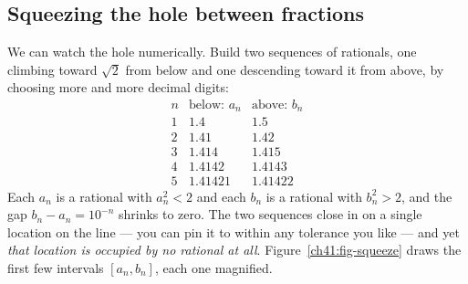 \subsection*{Squeezing the hole between fractions}

We can watch the hole numerically. Build two sequences of rationals, one climbing toward
$\sqrt 2$ from below and one descending toward it from above, by choosing more and more
decimal digits:
\[
\begin{array}{c|c|c}
n & \text{below: } a_n & \text{above: } b_n \\ \hline
1 & 1.4 & 1.5 \\
2 & 1.41 & 1.42 \\
3 & 1.414 & 1.415 \\
4 & 1.4142 & 1.4143 \\
5 & 1.41421 & 1.41422
\end{array}
\]
Each $a_n$ is a rational with $a_n^2 < 2$ and each $b_n$ is a rational with $b_n^2 > 2$,
and the gap $b_n - a_n = 10^{-n}$ shrinks to zero. The two sequences close in on a single
location on the line --- you can pin it to within any tolerance you like --- and yet
\emph{that location is occupied by no rational at all}.
Figure~\ref{ch41:fig-squeeze} draws the first few intervals $[a_n,b_n]$, each one magnified.

